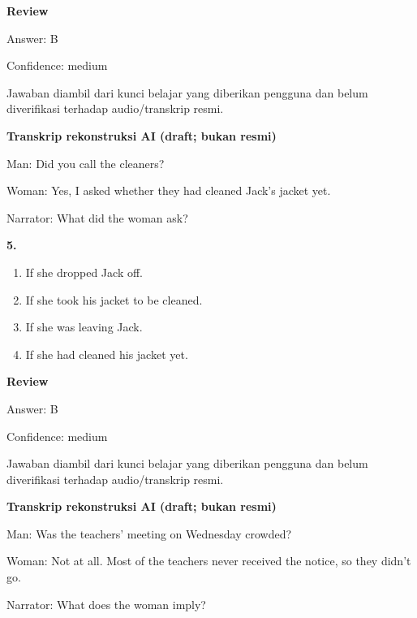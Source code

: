 \documentclass[12pt]{article}
\begin{document}
\par
\begingroup
\setlength{\parskip}{0pt}
\setlength{\parindent}{0pt}
\textbf{Review}\par
Answer: B\par
Confidence: medium\par
Jawaban diambil dari kunci belajar yang diberikan pengguna dan belum diverifikasi terhadap audio/transkrip resmi.\par
\endgroup
\par
\vspace{0.25\baselineskip}
\begin{exampleblock}
\textbf{Transkrip rekonstruksi AI (draft; bukan resmi)}\par
Man: Did you call the cleaners?\par
Woman: Yes, I asked whether they had cleaned Jack's jacket yet.\par
Narrator: What did the woman ask?\par
\end{exampleblock}
\noindent\textbf{5.}
\begin{enumerate}[label=(\Alph*),leftmargin=*,itemsep=0.2em]
\item If she dropped Jack off.
\item If she took his jacket to be cleaned.
\item If she was leaving Jack.
\item If she had cleaned his jacket yet.
\end{enumerate}
\par
\begingroup
\setlength{\parskip}{0pt}
\setlength{\parindent}{0pt}
\textbf{Review}\par
Answer: B\par
Confidence: medium\par
Jawaban diambil dari kunci belajar yang diberikan pengguna dan belum diverifikasi terhadap audio/transkrip resmi.\par
\endgroup
\par
\vspace{0.25\baselineskip}
\begin{exampleblock}
\textbf{Transkrip rekonstruksi AI (draft; bukan resmi)}\par
Man: Was the teachers' meeting on Wednesday crowded?\par
Woman: Not at all. Most of the teachers never received the notice, so they didn't go.\par
Narrator: What does the woman imply?\par
\end{exampleblock}
\end{document}
